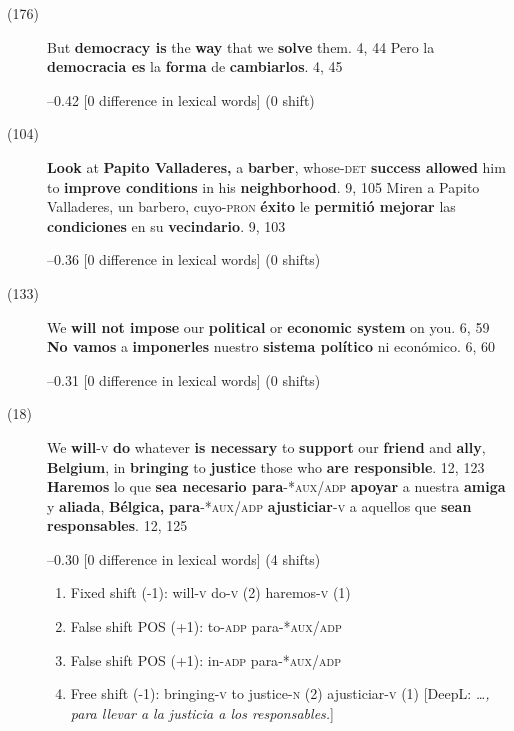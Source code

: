 \documentclass[output=paper]{langsci/langscibook}
\begin{document}
\begin{description}
  \item[(176)] But \textbf{democracy is} the \textbf{way} that we \textbf{solve} them. 4, 44 \rightarrow Pero la \textbf{democracia es} la \textbf{forma} de \textbf{cambiarlos}. 4, 45

    --0.42 [0 difference in lexical words] (0 shift)

  \item[(104)] \textbf{Look} at \textbf{Papito Valladeres,} a \textbf{barber}, whose\textsc{-det} \textbf{success allowed} him to \textbf{improve conditions} in his \textbf{neighborhood}. 9, 105 \rightarrow Miren a Papito Valladeres, un barbero, cuyo\textsc{-pron} \textbf{éxito} le \textbf{permitió mejorar} las \textbf{condiciones} en su \textbf{vecindario}. 9, 103

    --0.36 [0 difference in lexical words] (0 shifts)

  \item[(133)] We \textbf{will not impose} our \textbf{political} or \textbf{economic system} on you. 6, 59 \rightarrow \textbf{No vamos} a \textbf{imponerles} nuestro \textbf{sistema político} ni económico. 6, 60

    --0.31 [0 difference in lexical words] (0 shifts)

  \item[(18)] We \textbf{will}\textsc{-v} \textbf{do} whatever \textbf{is necessary} to \textbf{support} our \textbf{friend} and \textbf{ally}, \textbf{Belgium}, in \textbf{bringing} to \textbf{justice} those who \textbf{are responsible}. 12, 123 \rightarrow \textbf{Haremos} lo que \textbf{sea necesario para}\textsc{-*aux/adp} \textbf{apoyar} a nuestra \textbf{amiga} y \textbf{aliada}, \textbf{Bélgica,} \textbf{para}\textsc{-*aux/adp} \textbf{ajusticiar}\textsc{-v} a aquellos que \textbf{sean responsables}. 12, 125

    --0.30 [0 difference in lexical words] (4 shifts)

    \begin{enumerate}
      \item Fixed shift (-1): will\textsc{-v} do\textsc{-v} (2) \rightarrow haremos\textsc{-v} (1)
      \item False shift POS (+1): to\textsc{-adp}\textbf{ }\rightarrow para\textsc{-*aux/adp}
      \item False shift POS (+1): in\textsc{-adp}\textbf{ }\rightarrow para\textsc{-*aux/adp}
      \item Free shift (-1): bringing\textsc{-v} to justice\textsc{-n} (2) \rightarrow ajusticiar\textsc{-v} (1) [DeepL: \textit{\dots, para llevar a la justicia a los responsables.}]
    \end{enumerate}


\end{description}
\end{document}
